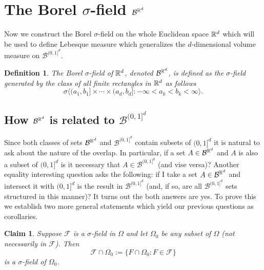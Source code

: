 \documentclass[10pt,letterpaper,twocolumn]{article}
\newtheorem{claim}{Claim}
\newtheorem{definition}{Definition}
\begin{document}
\section{The Borel $\sigma$-field $\mathcal B^{\Bbb R^d}$}

Now we construct the Borel $\sigma$-field on the whole Euclidean space $\Bbb R^d$ which will be used to define Lebesque measure which generalizes the $d$-dimensional volume measure on $\mathcal B^{(0,1]^d}$.

\begin{definition} The Borel $\sigma$-field of $\Bbb R^d$, denoted $\mathcal B^{\Bbb R^d}$, is defined as the $\sigma$-field generated by the class of all finite rectangles in $\Bbb R^d$ as follows
\[ \sigma\bigl\langle (a_1,b_1]\times \cdots \times (a_d,b_d]: -\infty< a_k < b_k<\infty \bigr\rangle. \]
\end{definition}



\subsection{How  $\mathcal B^{\Bbb R^d} $ is related to $\mathcal B^{(0,1]^d}$}
Since both classes of sets  $\mathcal B^{\Bbb R^d} $ and $\mathcal B^{(0,1]^d}$ contain subsets of $(0,1]^d$ it is natural to ask about  the nature of the overlap. In particular, if a set $A\in \mathcal B^{\Bbb R^d}$ and $A$ is also a subset of $(0,1]^d$ is it necessary that $A\in\mathcal B^{(0,1]^d}$ (and vise versa)? Another equality interesting question asks the following: if I take a set $A\in \mathcal B^{\Bbb R^d}$ and intersect it with $(0,1]^d$ is the result in $\mathcal B^{(0,1]^d}$ (and, if so, are all $\mathcal B^{(0,1]^d}$ sets structured in this manner)? It turns out the both answers are yes. To prove this we establish two  more general statements which yield our previous questions as corollaries.


\begin{claim}
\label{ccc}
Suppose $\mathcal F$ is a $\sigma$-field in $\Omega$ and let $\Omega_0$ be any subset of $\Omega$ (not necessarily in $\mathcal F$). Then 
\[\mathcal F\cap \Omega_0 := \{ F\cap \Omega_0: F\in \mathcal F\}\]
 is a $\sigma$-field of $\Omega_0$.  
\end{claim}
\end{document}
